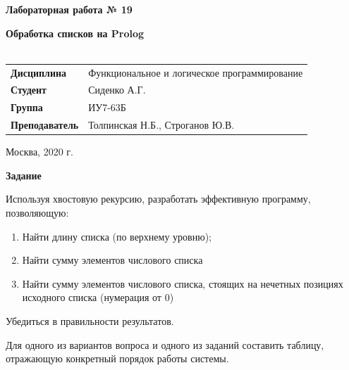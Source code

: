 \documentclass[a4paper,14pt]{extreport} %
\begin{document}
\begin{titlepage}
    \vspace{4cm}

    \begin{center}
        \textbf{Лабораторная работа № 19} \\ 
        \hfill
        
        \textbf{Обработка списков на Prolog} \\
        \vspace{0.5cm}
        \textbf{} \\
    \end{center}

    \vspace{4cm}

    \begin{flushleft}
        \begin{tabular}{ll}
            \textbf{Дисциплина} & Функциональное и логическое программирование \\
            \textbf{Студент} & Сиденко А.Г. \\
            \textbf{Группа} & ИУ7-63Б \\
            \textbf{Преподаватель} & Толпинская Н.Б., Строганов Ю.В.  \\
        \end{tabular}
    \end{flushleft}

    \vspace{4cm}

   \begin{center}
        Москва, 2020 г.
    \end{center}

\end{titlepage}

\textbf{Задание}

Используя хвостовую рекурсию, разработать эффективную программу, позволяющую:
\begin{enumerate}
\item Найти длину списка (по верхнему уровню);
\item Найти сумму элементов числового списка 
\item Найти сумму элементов числового списка, стоящих на нечетных позициях исходного списка (нумерация от 0) 
\end{enumerate}

Убедиться в правильности результатов. 

Для одного из вариантов вопроса и одного из заданий составить таблицу, отражающую конкретный порядок работы системы. 
\end{document}
